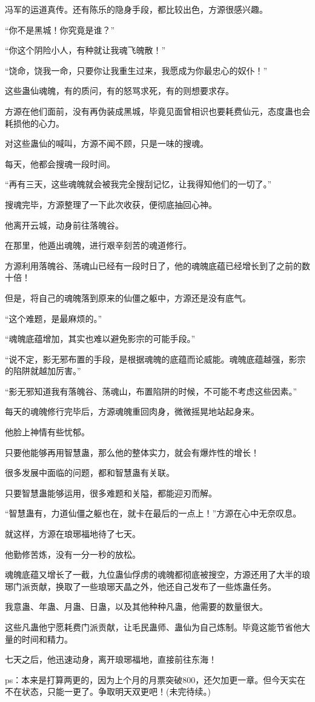 \begin{this_body}
冯军的运道真传。还有陈乐的隐身手段，都比较出色，方源很感兴趣。

“你不是黑城！你究竟是谁？”

“你这个阴险小人，有种就让我魂飞魄散！”

“饶命，饶我一命，只要你让我重生过来，我愿成为你最忠心的奴仆！”

这些蛊仙魂魄，有的质问，有的怒骂求死，有的则想要求存。

方源在他们面前，没有再伪装成黑城，毕竟见面曾相识也要耗费仙元，态度蛊也会耗损他的心力。

对这些蛊仙的喊叫，方源不闻不顾，只是一味的搜魂。

每天，他都会搜魂一段时间。

“再有三天，这些魂魄就会被我完全搜刮记忆，让我得知他们的一切了。”

搜魂完毕，方源整理了一下此次收获，便彻底抽回心神。

他离开云城，动身前往落魄谷。

在那里，他遁出魂魄，进行艰辛刻苦的魂道修行。

方源利用落魄谷、荡魂山已经有一段时日了，他的魂魄底蕴已经增长到了之前的数十倍！

但是，将自己的魂魄落到原来的仙僵之躯中，方源还是没有底气。

“这个难题，是最麻烦的。”

“魂魄底蕴增加，其实也难以避免影宗的可能手段。”

“说不定，影无邪布置的手段，是根据魂魄的底蕴而论威能。魂魄底蕴越强，影宗的陷阱就越加厉害。”

“影无邪知道我有落魄谷、荡魂山，布置陷阱的时候，不可能不考虑这些因素。”

每天的魂魄修行完毕后，方源魂魄重回肉身，微微摇晃地站起身来。

他脸上神情有些忧郁。

只要他能够再用智慧蛊，那么他的整体实力，就会有爆炸性的增长！

很多发展中面临的问题，都和智慧蛊有关联。

只要智慧蛊能够运用，很多难题和关隘，都能迎刃而解。

“智慧蛊有，力道仙僵之躯也在，就卡在最后的一点上！”方源在心中无奈叹息。

就这样，方源在琅琊福地待了七天。

他勤修苦炼，没有一分一秒的放松。

魂魄底蕴又增长了一截，九位蛊仙俘虏的魂魄都彻底被搜空，方源还用了大半的琅琊门派贡献，换取了一些琅琊天晶之外，他还自己发布了一些炼蛊任务。

我意蛊、年蛊、月蛊、日蛊，以及其他种种凡蛊，他需要的数量很大。

这些凡蛊他宁愿耗费门派贡献，让毛民蛊师、蛊仙为自己炼制。毕竟这能节省他大量的时间和精力。

七天之后，他迅速动身，离开琅琊福地，直接前往东海！

ps：本来是打算两更的，因为上个月的月票突破800，还欠加更一章。但今天实在不在状态，只能一更了。争取明天双更吧！(未完待续。)

\end{this_body}

